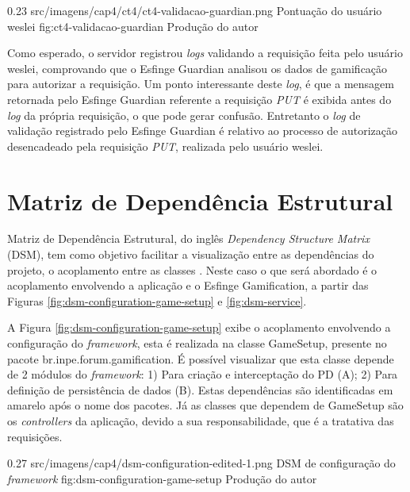 \begin{image}
{0.23}
{src/imagens/cap4/ct4/ct4-validacao-guardian.png}
{Pontuação do usuário weslei}
{fig:ct4-validacao-guardian}
{Produção do autor}
\end{image}

\par Como esperado, o servidor registrou \textit{logs} validando a requisição feita pelo usuário weslei, comprovando que o Esfinge Guardian analisou os dados de gamificação para autorizar a requisição. Um ponto interessante deste \textit{log}, é que a mensagem retornada pelo Esfinge Guardian referente a requisição \textit{PUT} é exibida antes do \textit{log} da própria requisição, o que pode gerar confusão. Entretanto o \textit{log} de validação registrado pelo Esfinge Guardian é relativo ao processo de autorização desencadeado pela requisição \textit{PUT}, realizada pelo usuário weslei.

\section{Matriz de Dependência Estrutural}

\par Matriz de Dependência Estrutural, do inglês \textit{Dependency Structure Matrix} (DSM), tem como objetivo facilitar a visualização entre as dependências do projeto, o acoplamento entre as classes \cite{browning2001applying}. Neste caso o que será abordado é o acoplamento envolvendo a aplicação e o Esfinge Gamification, a partir das Figuras \ref{fig:dsm-configuration-game-setup} e \ref{fig:dsm-service}.

\par A Figura \ref{fig:dsm-configuration-game-setup} exibe o acoplamento envolvendo a configuração do \textit{framework}, esta é realizada na classe GameSetup, presente no pacote br.inpe.forum.gamification. É possível visualizar que esta classe depende de 2 módulos do \textit{framework}: 1) Para criação e interceptação do PD (A); 2) Para definição de persistência de dados (B). Estas dependências são identificadas em amarelo após o nome dos pacotes. Já as classes que dependem de GameSetup são os \textit{controllers} da aplicação, devido a sua responsabilidade, que é a tratativa das requisições.

\begin{image}
{0.27}
{src/imagens/cap4/dsm-configuration-edited-1.png}
{DSM de configuração do \textit{framework}}
{fig:dsm-configuration-game-setup}
{Produção do autor}
\end{image}

